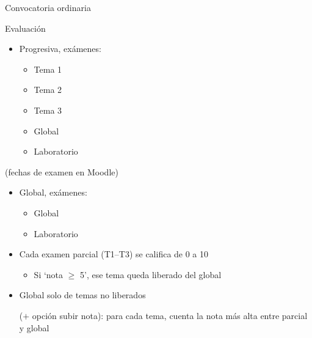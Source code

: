 \documentclass[aspectratio=169, usenames,svgnames,dvipsnames]{beamer}
\begin{document}

\begin{frame}{Convocatoria ordinaria}

    \begin{minipage}[t]{0.34\linewidth}
    \alert{Evaluación}
    \vspace{3mm}
    \begin{itemize}
    \item \alert{Progresiva}, exámenes:
        \begin{itemize}
        \item Tema 1
        \item Tema 2
        \item Tema 3
        \item Global
        \item Laboratorio
        \end{itemize}
    \end{itemize}
    (fechas de examen en Moodle)
    \begin{itemize}
    \item \alert{Global}, exámenes:
        \begin{itemize}
        \item Global
        \item Laboratorio
        \end{itemize}
    \end{itemize}
    \end{minipage}
    \hfill%
    \begin{minipage}[t]{0.65\linewidth}
    \pause
    \vspace{13.2mm}
        \begin{itemize}
        \item Cada examen parcial (T1–T3) se califica de 0 a 10
            \begin{itemize}
            \item {\normalsize Si `nota $\geq$ 5', ese \alert{tema queda liberado} del global}
            \end{itemize}
        \vspace{1.2mm}
        \item Global solo de temas no liberados 
        
        ($+$ \alert{opción subir nota}): para cada tema, cuenta la nota más alta entre parcial y global
        \end{itemize}    
    \end{minipage}

\end{frame}
\end{document}
